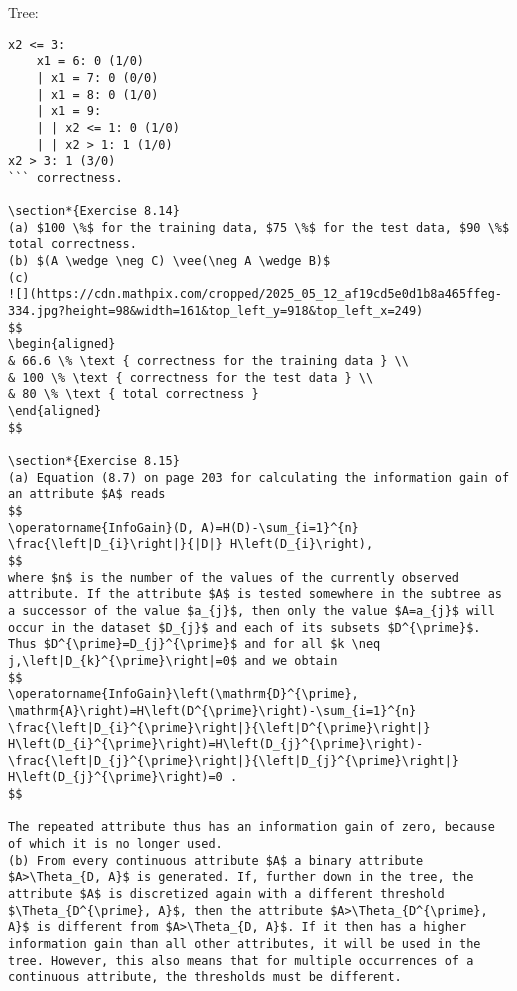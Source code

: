 \documentclass[10pt]{article}
\begin{document}
Tree:

\begin{verbatim}
x2 <= 3:
    x1 = 6: 0 (1/0)
    | x1 = 7: 0 (0/0)
    | x1 = 8: 0 (1/0)
    | x1 = 9:
    | | x2 <= 1: 0 (1/0)
    | | x2 > 1: 1 (1/0)
x2 > 3: 1 (3/0)
``` correctness.

\section*{Exercise 8.14}
(a) $100 \%$ for the training data, $75 \%$ for the test data, $90 \%$ total correctness.
(b) $(A \wedge \neg C) \vee(\neg A \wedge B)$
(c)
![](https://cdn.mathpix.com/cropped/2025_05_12_af19cd5e0d1b8a465ffeg-334.jpg?height=98&width=161&top_left_y=918&top_left_x=249)
$$
\begin{aligned}
& 66.6 \% \text { correctness for the training data } \\
& 100 \% \text { correctness for the test data } \\
& 80 \% \text { total correctness }
\end{aligned}
$$

\section*{Exercise 8.15}
(a) Equation (8.7) on page 203 for calculating the information gain of an attribute $A$ reads
$$
\operatorname{InfoGain}(D, A)=H(D)-\sum_{i=1}^{n} \frac{\left|D_{i}\right|}{|D|} H\left(D_{i}\right),
$$
where $n$ is the number of the values of the currently observed attribute. If the attribute $A$ is tested somewhere in the subtree as a successor of the value $a_{j}$, then only the value $A=a_{j}$ will occur in the dataset $D_{j}$ and each of its subsets $D^{\prime}$. Thus $D^{\prime}=D_{j}^{\prime}$ and for all $k \neq j,\left|D_{k}^{\prime}\right|=0$ and we obtain
$$
\operatorname{InfoGain}\left(\mathrm{D}^{\prime}, \mathrm{A}\right)=H\left(D^{\prime}\right)-\sum_{i=1}^{n} \frac{\left|D_{i}^{\prime}\right|}{\left|D^{\prime}\right|} H\left(D_{i}^{\prime}\right)=H\left(D_{j}^{\prime}\right)-\frac{\left|D_{j}^{\prime}\right|}{\left|D_{j}^{\prime}\right|} H\left(D_{j}^{\prime}\right)=0 .
$$

The repeated attribute thus has an information gain of zero, because of which it is no longer used.
(b) From every continuous attribute $A$ a binary attribute $A>\Theta_{D, A}$ is generated. If, further down in the tree, the attribute $A$ is discretized again with a different threshold $\Theta_{D^{\prime}, A}$, then the attribute $A>\Theta_{D^{\prime}, A}$ is different from $A>\Theta_{D, A}$. If it then has a higher information gain than all other attributes, it will be used in the tree. However, this also means that for multiple occurrences of a continuous attribute, the thresholds must be different.


\end{verbatim}
\end{document}
